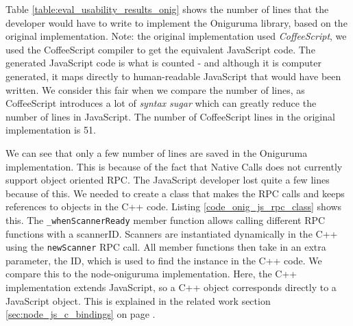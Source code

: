 Table \ref{table:eval_usability_results_onig} shows the number of lines that the developer would have to write to implement the Oniguruma library, based on the original implementation. Note: the original implementation used \emph{CoffeeScript}, we used the CoffeeScript compiler to get the equivalent JavaScript code. The generated JavaScript code is what is counted - and although it is computer generated, it maps directly to human-readable JavaScript that would have been written. We consider this fair when we compare the number of lines, as CoffeeScript introduces a lot of \emph{syntax sugar} which can greatly reduce the number of lines in JavaScript. The number of CoffeeScript lines in the original implementation is 51.

We can see that only a few number of lines are saved in the Oniguruma implementation. This is because of the fact that Native Calls does not currently support object oriented RPC. The JavaScript developer lost quite a few lines because of this. We needed to create a class that makes the RPC calls and keeps references to objects in the C++ code. Listing \ref{code_onig_js_rpc_class} shows this. The \lstinline{_whenScannerReady} member function allows calling different RPC functions with a scannerID. Scanners are instantiated dynamically in the C++ using the \lstinline{newScanner} RPC call. All member functions then take in an extra parameter, the ID, which is used to find the instance in the C++ code. We compare this to the node-oniguruma implementation. Here, the C++ implementation extends JavaScript, so a C++ object corresponds directly to a JavaScript object. This is explained in the related work section \ref{sec:node_js_c_bindings} on page \pageref{sec:node_js_c_bindings}.

